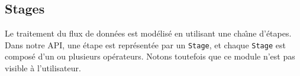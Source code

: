 \subsection{Stages}

Le traitement du flux de donn\'ees est mod\'elis\'e en utilisant une cha\^{\i}ne d'\'etapes. Dans notre API, une \'etape est repr\'esent\'ee par un \texttt{Stage}, et chaque \texttt{Stage} est compos\'e d'un ou plusieurs op\'erateurs. Notons toutefois que ce module n'est pas visible \`a l'utilisateur. 


